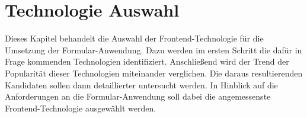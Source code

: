 \section{Technologie Auswahl}

Dieses Kapitel behandelt die Auswahl der Frontend-Technologie für die Umsetzung der Formular-Anwendung. Dazu  werden im ersten Schritt die dafür in Frage kommenden Technologien identifiziert.  Anschließend wird der Trend der Popularität dieser Technologien miteinander verglichen. Die daraus resultierenden Kandidaten sollen dann  detaillierter untersucht werden. In Hinblick auf die Anforderungen an die Formular-Anwendung soll dabei die angemessenste Frontend-Technologie ausgewählt werden.



